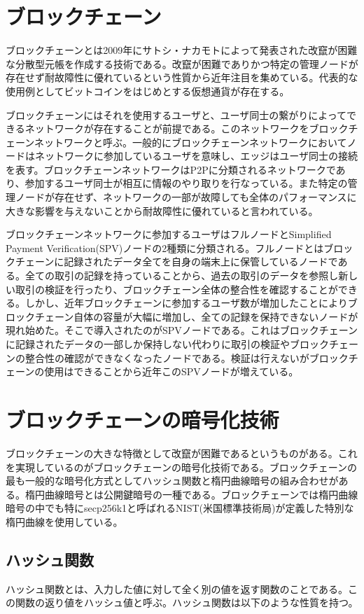 \documentclass[12pt]{jarticle}
\begin{document}
\section{ブロックチェーン}
ブロックチェーンとは2009年にサトシ・ナカモト\cite{satoshi}によって発表された改竄が困難な分散型元帳を作成する技術である。改竄が困難でありかつ特定の管理ノードが存在せず耐故障性に優れているという性質から近年注目を集めている。代表的な使用例としてビットコインをはじめとする仮想通貨が存在する。
\par
ブロックチェーンにはそれを使用するユーザと、ユーザ同士の繋がりによってできるネットワークが存在することが前提である。このネットワークをブロックチェーンネットワークと呼ぶ。一般的にブロックチェーンネットワークにおいてノードはネットワークに参加しているユーザを意味し、エッジはユーザ同士の接続を表す。ブロックチェーンネットワークはP2Pに分類されるネットワークであり、参加するユーザ同士が相互に情報のやり取りを行なっている。また特定の管理ノードが存在せず、ネットワークの一部が故障しても全体のパフォーマンスに大きな影響を与えないことから耐故障性に優れていると言われている。
\par
ブロックチェーンネットワークに参加するユーザはフルノードとSimplified Payment Verification(SPV)ノードの2種類に分類される。フルノードとはブロックチェーンに記録されたデータ全てを自身の端末上に保管しているノードである。全ての取引の記録を持っていることから、過去の取引のデータを参照し新しい取引の検証を行ったり、ブロックチェーン全体の整合性を確認することができる。しかし、近年ブロックチェーンに参加するユーザ数が増加したことによりブロックチェーン自体の容量が大幅に増加し、全ての記録を保持できないノードが現れ始めた。そこで導入されたのがSPVノードである。これはブロックチェーンに記録されたデータの一部しか保持しない代わりに取引の検証やブロックチェーンの整合性の確認ができなくなったノードである。検証は行えないがブロックチェーンの使用はできることから近年このSPVノードが増えている。

\section{ブロックチェーンの暗号化技術}
ブロックチェーンの大きな特徴として改竄が困難であるというものがある。これを実現しているのがブロックチェーンの暗号化技術である。ブロックチェーンの最も一般的な暗号化方式としてハッシュ関数と楕円曲線暗号の組み合わせがある。楕円曲線暗号とは公開鍵暗号の一種である。ブロックチェーンでは楕円曲線暗号の中でも特にsecp256k1と呼ばれるNIST(米国標準技術局)が定義した特別な楕円曲線を使用している。

\subsection{ハッシュ関数}
ハッシュ関数とは、入力した値に対して全く別の値を返す関数のことである。この関数の返り値をハッシュ値と呼ぶ。ハッシュ関数は以下のような性質を持つ。
\end{document}
